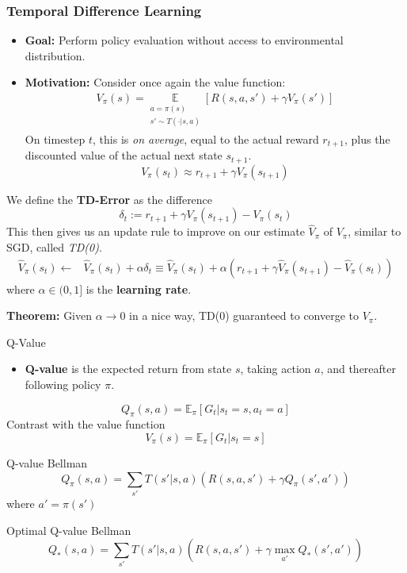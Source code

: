 \begin{frame}
\frametitle{Temporal Difference Learning}

\begin{itemize}
	\item \textbf{Goal:} Perform policy evaluation without access to environmental
	distribution.
	\pause
	\item \textbf{Motivation:} Consider once again the value function:
	\begin{align*}
		V_\pi(s) = 
		\underset{\substack{a = \pi(s) \\ s' \sim T(\cdot | s, a)}}{\mathbb{E}} \left[ R(s,a,s') + \gamma V_\pi(s') \right] 
	\end{align*}
\pause
	On timestep $t$, this is \textit{on average}, equal to the actual reward $r_{t+1}$, plus the discounted value of the actual next state $s_{t+1}$.
	$$
	V_{\pi}(s_t) \approx r_{t+1} + \gamma V_{\pi}(s_{t+1})
	$$
	\pause
\end{itemize}
\vspace{-0.5cm}
We define the \textbf{TD-Error} as the difference 
$$
\delta_t := r_{t+1} + \gamma V_\pi(s_{t+1}) - V_\pi(s_t)
$$
\pause
This then gives us an update rule to improve on our estimate $\hat{V}_\pi$ 
of $V_\pi$,
similar to SGD, called \textit{TD(0)}.
\begin{align*}
\hat{V}_\pi(s_t)  \leftarrow &\hat{V}_\pi(s_t) + \alpha \delta_t  
 \equiv \hat{V}_\pi(s_t) + \alpha \left( r_{t+1} + \gamma \hat{V}_\pi(s_{t+1}) - \hat{V}_\pi(s_t) \right) 
\end{align*}
where $\alpha \in (0,1]$ is the \textbf{learning rate}.

\textbf{Theorem:} Given $\alpha \to 0$ in a nice way, 
TD(0) guaranteed to converge to $V_\pi$. 

\end{frame}

\begin{frame}{Q-Value}
	\begin{itemize}
		\item \textbf{Q-value} is the expected return
		from state $s$, taking action $a$, and thereafter following policy $\pi$. 
	\end{itemize}
$$
Q_\pi(s,a)	= \mathbb{E}_\pi [G_t  | s_t =  s, a_t = a]
$$
\pause
Contrast with the value function
$$
V_\pi(s)= \mathbb{E}_\pi [G_t  | s_t =  s]
$$
\pause
\begin{block}{Q-value Bellman}
	$$
	Q_\pi(s,a) = \sum_{s'} T(s' | s, a) \left( R(s,a,s') + \gamma Q_\pi(s', a') \right)
	$$
	where $a' = \pi(s')$
\end{block}
\begin{block}{Optimal Q-value Bellman}
	$$
	Q_*(s,a) = \sum_{s'} T(s' | s, a) \left( R(s,a,s') + \gamma \max_{a'} Q_*(s', a') 
	\right)
	$$
\end{block}
\end{frame}

